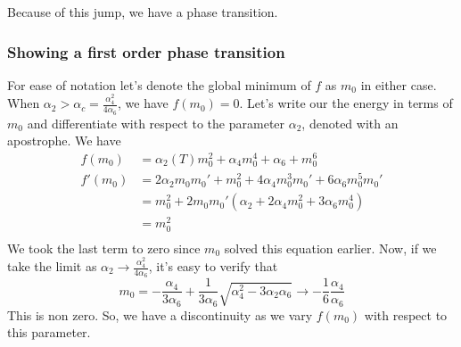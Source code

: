 \documentclass[11pt, oneside]{article}   	%
\begin{document}
Because of this jump, we have a phase transition. 

\subsubsection*{Showing a first order phase transition} 
For ease of notation let's denote the global minimum of $ f $
as  $ m_0 $ in either case. 
When $ \alpha_2 > \alpha_{ c } = \frac{ \alpha_4^ 2 }{4 \alpha_6 }$, we have $ f ( m _0 ) = 0$. 
Let's write our the energy in terms of $  m_0$ and differentiate with 
respect to the parameter $\alpha_2 $, denoted with an apostrophe. 
We have 
\begin{align*}
	f( m_0 ) &=  \alpha_2( T ) m_0^ 2 + \alpha_4 m_0 ^ 4 + \alpha_6 + m_0 ^ 6  \\
	f' ( m_ 0 ) & = 2 \alpha_2 m_0 m_0' + m_0^ 2 + 4\alpha_4 m_0 ^ 3 m_0' + 6 \alpha_6 m_0^ 5 m_0' \\
		    &=  m_0 ^ 2 + 2 m_0 m_0' (  \alpha_2 + 2 \alpha_4 m_0^ 2 + 3 \alpha_6 m_0 ^ 4 )  \\
		    &=  m_0 ^ 2  \\
\end{align*}
We took the last term to zero since $ m_0 $ solved this equation earlier. 
Now, if we take the limit as $ \alpha_2 \to \frac{ \alpha_4 ^ 2 }{4  \alpha_6 }$, 
it's easy to verify that 
\[
	m_0 =  - \frac{\alpha_4 }{3 \alpha_6 }+ \frac{1}{3 \alpha_6 }\sqrt{ \alpha_4^ 2 - 3 \alpha_2 \alpha_6 } \to  - \frac{1}{6 }\frac{\alpha_4 }{\alpha_6 }  
\] This is non zero. So, we have a discontinuity as we vary $ f( m_0 ) $ with respect to this parameter. 
\end{document}
